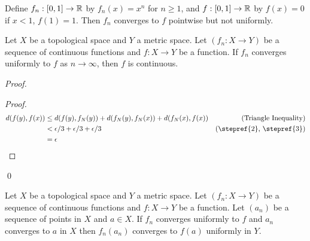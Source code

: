 \begin{example}
    Define $f_n : [0,1] \rightarrow \mathbb{R}$ by $f_n(x) = x^n$ for $n \geq 1$, and $f : [0,1] \rightarrow \mathbb{R}$ by $f(x) = 0$ if $x < 1$, $f(1) = 1$.  Then $f_n$ converges to $f$
    pointwise but not uniformly.
\end{example}

\begin{theorem}
    Let $X$ be a topological space and $Y$ a metric space.  Let $(f_n : X \rightarrow Y)$ be a sequence of continuous functions and $f : X \rightarrow Y$ be a function.
    If $f_n$ converges uniformly to $f$ as $n \rightarrow \infty$, then $f$ is continuous.
\end{theorem}

\begin{proof}
    \pf
    \begin{proof}
        \pf
        \begin{align*}
            d(f(y),f(x)) & \leq d(f(y),f_N(y)) + d(f_N(y),f_N(x)) + d(f_N(x),f(x)) & (\text{Triangle Inequality}) \\
            & < \epsilon / 3 + \epsilon / 3 + \epsilon / 3 & (\text{\stepref{2}, \stepref{3}})\\
            & = \epsilon
        \end{align*}
    \end{proof}
    \qed
\end{proof}

\begin{proposition}
    Let $X$ be a topological space and $Y$ a metric space.  Let $(f_n : X \rightarrow Y)$ be a sequence of continuous functions and $f : X \rightarrow Y$ be a function.
    Let $(a_n)$ be a sequence of points in $X$ and $a \in X$. If $f_n$ converges uniformly to $f$ and $a_n$ converges to $a$ in $X$ then $f_n(a_n)$ converges to $f(a)$
    uniformly in $Y$.
\end{proposition}

